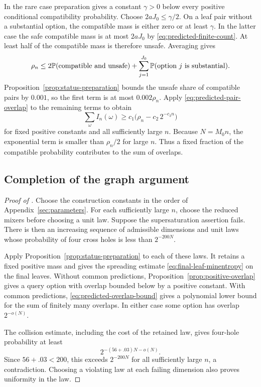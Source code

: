 In the rare case preparation gives a constant \(\gamma>0\) below every
positive conditional compatibility probability. Choose \(2aJ_0\le\gamma/2\).
On a leaf pair without a substantial option, the compatible mass is
either zero or at least \(\gamma\). In the latter case the safe compatible
mass is at most \(2aJ_0\) by \eqref{eq:predicted-finite-count}. At least
half of the compatible mass is therefore unsafe. Averaging gives
\begin{equation}\label{eq:predicted-rare-count}
 \rho_n\le2\mathbb P(\text{compatible and unsafe})
       +\sum_{j=1}^{J_0}\mathbb P(\text{option }j\text{ is substantial}).
\end{equation}
Proposition~\ref{prop:status-preparation} bounds the unsafe share
of compatible pairs by \(0.001\), so the first term is at most
\(0.002\rho_n\). Apply
\eqref{eq:predicted-pair-overlap} to the remaining terms to obtain
\begin{equation}\label{eq:predicted-overlap-bound}
 \sum_\omega I_n(\omega)\ge
      c_1\bigl(\rho_n-c_2\,2^{-c_3n}\bigr)
\end{equation}
for fixed positive constants and all sufficiently large \(n\).
Because \(N=M_0n\), the exponential term is smaller than
\(\rho_n/2\) for large \(n\). Thus a fixed fraction of the compatible
probability contributes to the sum of overlaps.

\subsection{Completion of the graph argument}

\begin{proof}[Proof of ]
Choose the construction constants in the order of Appendix~\ref{sec:parameters}.
For each sufficiently large \(n\), choose the reduced mixers before
choosing a unit law. Suppose the supersaturation assertion fails.
There is then an increasing sequence of admissible dimensions and unit
laws whose probability of four cross holes is less than \(2^{-200N}\).

Apply Proposition~\ref{prop:status-preparation} to each of these laws.
It retains a fixed positive mass and gives the spreading estimate
\eqref{eq:final-leaf-minentropy} on the final leaves.
Without common predictions, Proposition~\ref{prop:positive-overlap} gives a query
option with overlap bounded below by a positive constant. With common
predictions, \eqref{eq:predicted-overlap-bound} gives a polynomial lower
bound for the sum of finitely many overlaps. In either case some option
has overlap \(2^{-o(N)}\).

The collision estimate, including the cost of the retained law, gives
four-hole probability at least
\[
 2^{-(56+.03)N-o(N)}.
\]
Since \(56+.03<200\), this exceeds \(2^{-200N}\) for all sufficiently
large \(n\), a contradiction. Choosing a violating law at each failing
dimension also proves uniformity in the law.
\end{proof}

